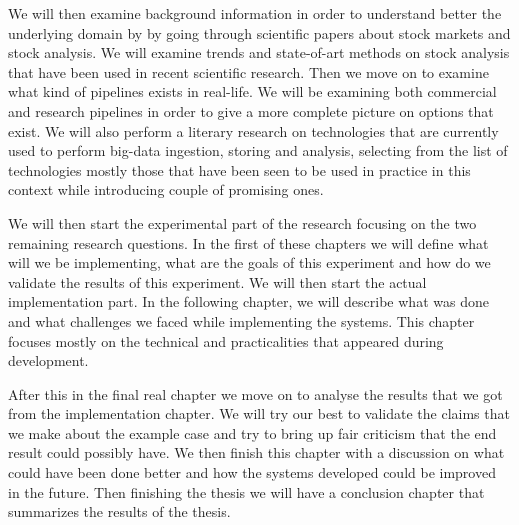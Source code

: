 We will then examine background information in order to understand better the underlying domain by by going through scientific papers about stock markets and stock analysis.
We will examine trends and state-of-art methods on stock analysis that have been used in recent scientific research.
Then we move on to examine what kind of pipelines exists in real-life.
We will be examining both commercial and research pipelines in order to give a more complete picture on options that exist.
We will also perform a literary research on technologies that are currently used to perform big-data ingestion, storing and analysis, selecting from the list of technologies mostly those that have been seen to be used in practice in this context while introducing couple of promising ones.

We will then start the experimental part of the research focusing on the two remaining research questions. 
In the first of these chapters we will define what will we be implementing, what are the goals of this experiment and how do we validate the results of this experiment.
We will then start the actual implementation part.
In the following chapter, we will describe what was done and what challenges we faced while implementing the systems.
This chapter focuses mostly on the technical and practicalities that appeared during development.

After this in the final real chapter we move on to analyse the results that we got from the implementation chapter. 
We will try our best to validate the claims that we make about the example case and try to bring up fair criticism that the end result could possibly have.
We then finish this chapter with a discussion on what could have been done better and how the systems developed could be improved in the future.
Then finishing the thesis we will have a conclusion chapter that summarizes the results of the thesis.
